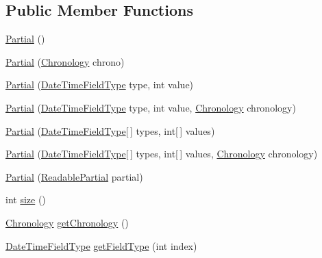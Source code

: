 \subsection*{Public Member Functions}
\begin{DoxyCompactItemize}
\item 
\hyperlink{classorg_1_1joda_1_1time_1_1_partial_aa22959ff4b3763d5cf237215db1c36ea}{Partial} ()
\item 
\hyperlink{classorg_1_1joda_1_1time_1_1_partial_adda0095be4d3edf554b9c12377e78fbc}{Partial} (\hyperlink{classorg_1_1joda_1_1time_1_1_chronology}{Chronology} chrono)
\item 
\hyperlink{classorg_1_1joda_1_1time_1_1_partial_a488e05bdf520014b19e2ea0cbc20ef1d}{Partial} (\hyperlink{classorg_1_1joda_1_1time_1_1_date_time_field_type}{Date\-Time\-Field\-Type} type, int value)
\item 
\hyperlink{classorg_1_1joda_1_1time_1_1_partial_af2bcde29f90e55f80ecc0a64b0a0f450}{Partial} (\hyperlink{classorg_1_1joda_1_1time_1_1_date_time_field_type}{Date\-Time\-Field\-Type} type, int value, \hyperlink{classorg_1_1joda_1_1time_1_1_chronology}{Chronology} chronology)
\item 
\hyperlink{classorg_1_1joda_1_1time_1_1_partial_a3a1184fca216e97a56121549b288780c}{Partial} (\hyperlink{classorg_1_1joda_1_1time_1_1_date_time_field_type}{Date\-Time\-Field\-Type}\mbox{[}$\,$\mbox{]} types, int\mbox{[}$\,$\mbox{]} values)
\item 
\hyperlink{classorg_1_1joda_1_1time_1_1_partial_a8c2ba9e7636b4af570b6293ca9ddb9dd}{Partial} (\hyperlink{classorg_1_1joda_1_1time_1_1_date_time_field_type}{Date\-Time\-Field\-Type}\mbox{[}$\,$\mbox{]} types, int\mbox{[}$\,$\mbox{]} values, \hyperlink{classorg_1_1joda_1_1time_1_1_chronology}{Chronology} chronology)
\item 
\hyperlink{classorg_1_1joda_1_1time_1_1_partial_a4a681c89b29dc2f2d131692ce74f492b}{Partial} (\hyperlink{interfaceorg_1_1joda_1_1time_1_1_readable_partial}{Readable\-Partial} partial)
\item 
int \hyperlink{classorg_1_1joda_1_1time_1_1_partial_afdfd7342ca2f1023d07455364a4334f8}{size} ()
\item 
\hyperlink{classorg_1_1joda_1_1time_1_1_chronology}{Chronology} \hyperlink{classorg_1_1joda_1_1time_1_1_partial_a974496fc4369187da4926b3d8f8f78f9}{get\-Chronology} ()
\item 
\hyperlink{classorg_1_1joda_1_1time_1_1_date_time_field_type}{Date\-Time\-Field\-Type} \hyperlink{classorg_1_1joda_1_1time_1_1_partial_a30f69248005cbc4a262b95585d0a9fdb}{get\-Field\-Type} (int index)

\end{DoxyCompactItemize}

